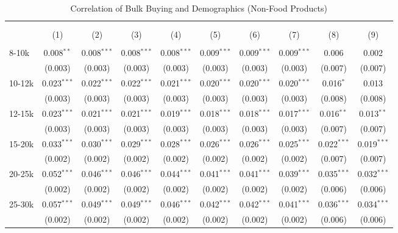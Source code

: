 
\begin{table}[!htbp] \centering 
  \caption{Correlation of Bulk Buying and Demographics (Non-Food Products)} 
  \label{tab:discountingBehaviorNonFood} 
\begin{tabular}{@{\extracolsep{5pt}}lccccccccc} 
\\[-1.8ex]\hline 
\hline \\[-1.8ex] 
\\[-1.8ex] & (1) & (2) & (3) & (4) & (5) & (6) & (7) & (8) & (9)\\ 
\hline \\[-1.8ex] 
 8-10k & 0.008$^{**}$ & 0.008$^{***}$ & 0.008$^{***}$ & 0.008$^{***}$ & 0.009$^{***}$ & 0.009$^{***}$ & 0.009$^{***}$ & 0.006 & 0.002 \\ 
  & (0.003) & (0.003) & (0.003) & (0.003) & (0.003) & (0.003) & (0.003) & (0.007) & (0.007) \\ 
  10-12k & 0.023$^{***}$ & 0.022$^{***}$ & 0.022$^{***}$ & 0.021$^{***}$ & 0.020$^{***}$ & 0.020$^{***}$ & 0.020$^{***}$ & 0.016$^{*}$ & 0.013 \\ 
  & (0.003) & (0.003) & (0.003) & (0.003) & (0.003) & (0.003) & (0.003) & (0.008) & (0.008) \\ 
  12-15k & 0.023$^{***}$ & 0.021$^{***}$ & 0.021$^{***}$ & 0.019$^{***}$ & 0.018$^{***}$ & 0.018$^{***}$ & 0.017$^{***}$ & 0.016$^{**}$ & 0.013$^{**}$ \\ 
  & (0.003) & (0.003) & (0.003) & (0.003) & (0.003) & (0.003) & (0.003) & (0.007) & (0.007) \\ 
  15-20k & 0.033$^{***}$ & 0.030$^{***}$ & 0.029$^{***}$ & 0.028$^{***}$ & 0.026$^{***}$ & 0.026$^{***}$ & 0.025$^{***}$ & 0.022$^{***}$ & 0.019$^{***}$ \\ 
  & (0.002) & (0.002) & (0.002) & (0.002) & (0.002) & (0.002) & (0.002) & (0.007) & (0.007) \\ 
  20-25k & 0.052$^{***}$ & 0.046$^{***}$ & 0.046$^{***}$ & 0.044$^{***}$ & 0.041$^{***}$ & 0.041$^{***}$ & 0.039$^{***}$ & 0.035$^{***}$ & 0.032$^{***}$ \\ 
  & (0.002) & (0.002) & (0.002) & (0.002) & (0.002) & (0.002) & (0.002) & (0.006) & (0.006) \\ 
  25-30k & 0.057$^{***}$ & 0.049$^{***}$ & 0.049$^{***}$ & 0.046$^{***}$ & 0.042$^{***}$ & 0.042$^{***}$ & 0.041$^{***}$ & 0.036$^{***}$ & 0.034$^{***}$ \\ 
  & (0.002) & (0.002) & (0.002) & (0.002) & (0.002) & (0.002) & (0.002) & (0.006) & (0.006) \\ 

\end{tabular}
\end{table}
